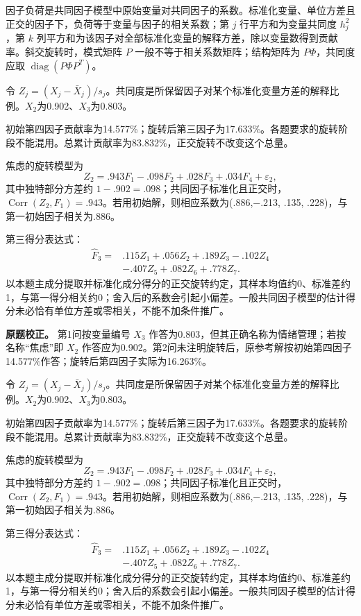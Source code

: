 因子负荷是共同因子模型中原始变量对共同因子的系数。标准化变量、单位方差且正交的因子下，负荷等于变量与因子的相关系数；第 \(j\) 行平方和为变量共同度 \(h_j^2\)，第 \(k\) 列平方和为该因子对全部标准化变量的解释方差，除以变量数得到贡献率。斜交旋转时，模式矩阵 \(P\) 一般不等于相关系数矩阵；结构矩阵为 \(P\Phi\)，共同度应取 \(\operatorname{diag}(P\Phi P^T)\)。



令 \(Z_j=(X_j-\bar X_j)/s_j\)。共同度是所保留因子对某个标准化变量方差的解释比例。\(X_2\)为0.902、\(X_3\)为0.803。

初始第四因子贡献率为14.577\%；旋转后第三因子为17.633\%。各题要求的旋转阶段不能混用。总累计贡献率为83.832\%，正交旋转不改变这个总量。

焦虑的旋转模型为 \[Z_2=.943F_1-.098F_2+.028F_3+.034F_4+\varepsilon_2,\] 其中独特部分方差约 \(1-.902=.098\)；共同因子标准化且正交时，\(\operatorname{Corr}(Z_2,F_1)=.943\)。若用初始解，则相应系数为(.886,−.213, .135, .228)，与第一初始因子相关为.886。

第三得分表达式： \[\begin{aligned}\widehat F_3={}&.115Z_1+.056Z_2+.189Z_3-.102Z_4\\&-.407Z_5+.082Z_6+.778Z_7.\end{aligned}\] 以本题主成分提取并标准化成分得分的正交旋转约定，其样本均值约0、标准差约1，与第一得分相关约0；舍入后的系数会引起小偏差。一般共同因子模型的估计得分未必恰有单位方差或零相关，不能不加条件推广。

\textbf{原题校正。} 第1问按变量编号 \(X_3\) 作答为0.803，但其正确名称为情绪管理；若按名称``焦虑''即 \(X_2\) 作答应为0.902。第2问未注明旋转后，原参考解按初始第四因子14.577\%作答；旋转后第四因子实际为16.263\%。



令 \(Z_j=(X_j-\bar X_j)/s_j\)。共同度是所保留因子对某个标准化变量方差的解释比例。\(X_2\)为0.902、\(X_3\)为0.803。

初始第四因子贡献率为14.577\%；旋转后第三因子为17.633\%。各题要求的旋转阶段不能混用。总累计贡献率为83.832\%，正交旋转不改变这个总量。

焦虑的旋转模型为 \[Z_2=.943F_1-.098F_2+.028F_3+.034F_4+\varepsilon_2,\] 其中独特部分方差约 \(1-.902=.098\)；共同因子标准化且正交时，\(\operatorname{Corr}(Z_2,F_1)=.943\)。若用初始解，则相应系数为(.886,−.213, .135, .228)，与第一初始因子相关为.886。

第三得分表达式： \[\begin{aligned}\widehat F_3={}&.115Z_1+.056Z_2+.189Z_3-.102Z_4\\&-.407Z_5+.082Z_6+.778Z_7.\end{aligned}\] 以本题主成分提取并标准化成分得分的正交旋转约定，其样本均值约0、标准差约1，与第一得分相关约0；舍入后的系数会引起小偏差。一般共同因子模型的估计得分未必恰有单位方差或零相关，不能不加条件推广。


